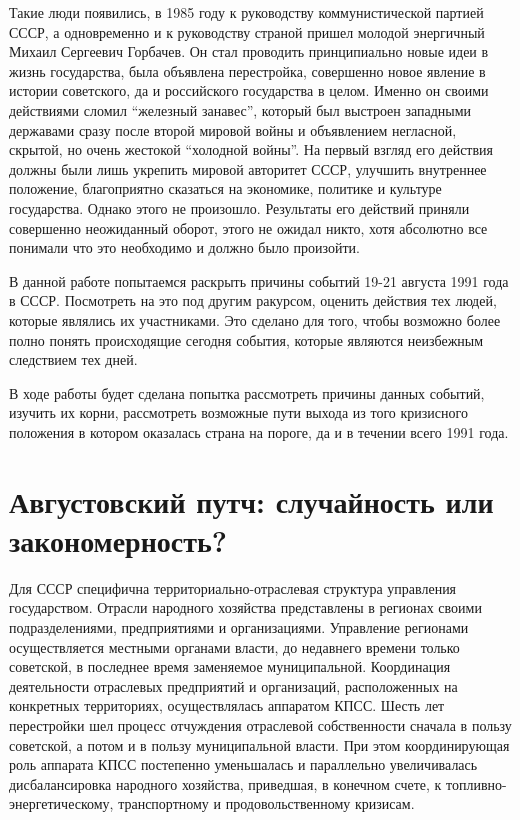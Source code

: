 \documentclass[12pt]{extarticle}
\begin{document}
Такие люди появились, в 1985 году к руководству коммунистической партией СССР, а одновременно и к руководству страной пришел молодой энергичный Михаил Сергеевич Горбачев. Он стал проводить принципиально новые идеи в жизнь государства, была объявлена перестройка, совершенно новое явление в истории советского, да и российского государства в целом. Именно он своими действиями сломил “железный занавес”, который был выстроен западными державами сразу после второй мировой войны и объявлением негласной, скрытой, но очень жестокой “холодной войны”. На первый взгляд его действия должны были лишь укрепить мировой авторитет СССР, улучшить внутреннее положение, благоприятно сказаться на экономике, политике и культуре государства. Однако этого не произошло. Результаты его действий приняли совершенно неожиданный оборот, этого не ожидал никто, хотя абсолютно все понимали что это необходимо и должно было произойти.

В данной работе попытаемся раскрыть причины событий 19-21 августа 1991 года в СССР. Посмотреть на это под другим ракурсом, оценить действия тех людей, которые являлись их участниками. Это сделано для того, чтобы возможно более полно понять происходящие сегодня события, которые являются неизбежным следствием тех дней.

В ходе работы будет сделана попытка рассмотреть причины данных событий, изучить их корни, рассмотреть возможные пути выхода из того кризисного положения в котором оказалась страна на пороге, да и в течении всего 1991 года.


\section{Августовский путч: случайность или закономерность?}
Для СССР специфична территориально-отраслевая структура управления государством. Отрасли народного хозяйства представлены в регионах своими подразделениями, предприятиями и организациями. Управление регионами осуществляется местными органами власти, до недавнего времени только советской, в последнее время заменяемое муниципальной. Координация деятельности отраслевых предприятий и организаций, расположенных на конкретных территориях, осуществлялась аппаратом КПСС. Шесть лет перестройки шел процесс отчуждения отраслевой собственности сначала в пользу советской, а потом и в пользу муниципальной власти. При этом координирующая роль аппарата КПСС постепенно уменьшалась и параллельно увеличивалась дисбалансировка народного хозяйства, приведшая, в конечном счете, к топливно-энергетическому, транспортному и продовольственному кризисам.
\end{document}

